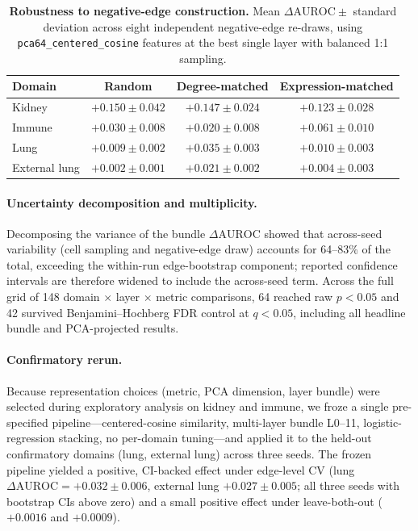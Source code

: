 \documentclass[11pt]{article}
\newcommand{\DAURC}{\Delta\mathrm{AUROC}}
\begin{document}
\begin{table}[t]
\centering
\caption{\textbf{Robustness to negative-edge construction.}
Mean $\DAURC \pm$ standard deviation across eight independent negative-edge re-draws, using \texttt{pca64\_centered\_cosine} features at the best single layer with balanced 1:1 sampling.}
\label{tab:negrobust}
\small
\begin{tabular}{lccc}
\toprule
\textbf{Domain} & \textbf{Random} & \textbf{Degree-matched} & \textbf{Expression-matched} \\
\midrule
Kidney        & $+0.150 \pm 0.042$ & $+0.147 \pm 0.024$ & $+0.123 \pm 0.028$ \\
Immune        & $+0.030 \pm 0.008$ & $+0.020 \pm 0.008$ & $+0.061 \pm 0.010$ \\
Lung          & $+0.009 \pm 0.002$ & $+0.035 \pm 0.003$ & $+0.010 \pm 0.003$ \\
External lung & $+0.002 \pm 0.001$ & $+0.021 \pm 0.002$ & $+0.004 \pm 0.003$ \\
\bottomrule
\end{tabular}
\end{table}

\paragraph{Uncertainty decomposition and multiplicity.}
Decomposing the variance of the bundle $\DAURC$ showed that across-seed variability (cell sampling and negative-edge draw) accounts for 64--83\% of the total, exceeding the within-run edge-bootstrap component; reported confidence intervals are therefore widened to include the across-seed term.
Across the full grid of 148 domain $\times$ layer $\times$ metric comparisons, 64 reached raw $p < 0.05$ and 42 survived Benjamini--Hochberg FDR control at $q < 0.05$, including all headline bundle and PCA-projected results.

\paragraph{Confirmatory rerun.}
Because representation choices (metric, PCA dimension, layer bundle) were selected during exploratory analysis on kidney and immune, we froze a single pre-specified pipeline---centered-cosine similarity, multi-layer bundle L0--11, logistic-regression stacking, no per-domain tuning---and applied it to the held-out confirmatory domains (lung, external lung) across three seeds.
The frozen pipeline yielded a positive, CI-backed effect under edge-level CV (lung $\DAURC = +0.032 \pm 0.006$, external lung $+0.027 \pm 0.005$; all three seeds with bootstrap CIs above zero) and a small positive effect under leave-both-out ($+0.0016$ and $+0.0009$).
\end{document}
